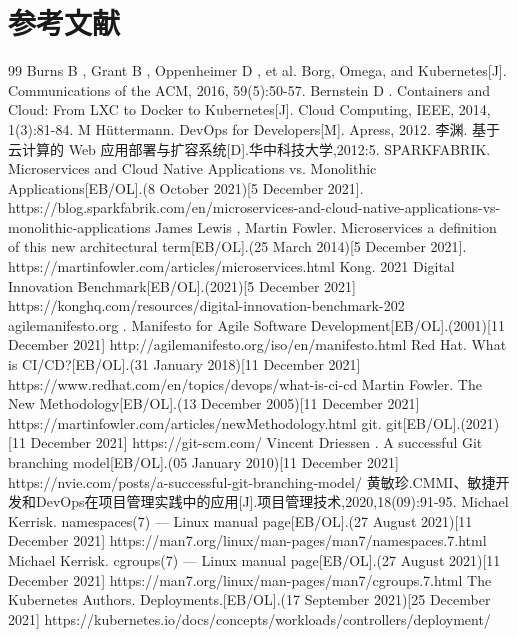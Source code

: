 \documentclass{article}
\begin{document}
\section{参考文献}
\begin{thebibliography} {99}
     Burns B , Grant B , Oppenheimer D , et al. Borg, Omega, and Kubernetes[J]. Communications of the ACM, 2016, 59(5):50-57.
     Bernstein D . Containers and Cloud: From LXC to Docker to Kubernetes[J]. Cloud Computing, IEEE, 2014, 1(3):81-84.
     M Hüttermann. DevOps for Developers[M]. Apress, 2012.
     李渊. 基于云计算的 Web 应用部署与扩容系统[D].华中科技大学,2012:5.
     SPARKFABRIK. Microservices and Cloud Native Applications vs. Monolithic Applications[EB/OL].(8 October 2021)[5 December 2021]. https://blog.sparkfabrik.com/en/microservices-and-cloud-native-applications-vs-monolithic-applications
     James Lewis , Martin Fowler. Microservices a definition of this new architectural term[EB/OL].(25 March 2014)[5 December 2021]. https://martinfowler.com/articles/microservices.html
     Kong. 2021 Digital Innovation Benchmark[EB/OL].(2021)[5 December 2021] https://konghq.com/resources/digital-innovation-benchmark-202
    agilemanifesto.org . Manifesto for Agile Software Development[EB/OL].(2001)[11 December 2021] http://agilemanifesto.org/iso/en/manifesto.html
    Red Hat. What is CI/CD?[EB/OL].(31 January 2018)[11 December 2021] https://www.redhat.com/en/topics/devops/what-is-ci-cd
    Martin Fowler. The New Methodology[EB/OL].(13 December 2005)[11 December 2021] https://martinfowler.com/articles/newMethodology.html 
    git. git[EB/OL].(2021)[11 December 2021] https://git-scm.com/
    Vincent Driessen . A successful Git branching model[EB/OL].(05 January  2010)[11 December 2021] https://nvie.com/posts/a-successful-git-branching-model/
    黄敏珍.CMMI、敏捷开发和DevOps在项目管理实践中的应用[J].项目管理技术,2020,18(09):91-95.
    Michael Kerrisk. namespaces(7) — Linux manual page[EB/OL].(27 August 2021)[11 December 2021] https://man7.org/linux/man-pages/man7/namespaces.7.html
    Michael Kerrisk. cgroups(7) — Linux manual page[EB/OL].(27 August 2021)[11 December 2021] https://man7.org/linux/man-pages/man7/cgroups.7.html
    The Kubernetes Authors. Deployments.[EB/OL].(17 September 2021)[25 December 2021] https://kubernetes.io/docs/concepts/workloads/controllers/deployment/

\end{thebibliography}
\end{document}
